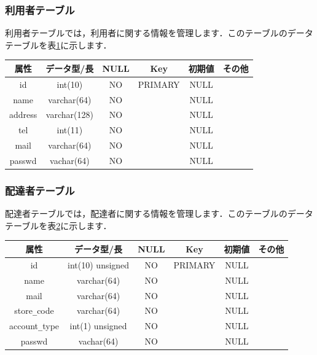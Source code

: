 \documentclass[a4j,titlepage]{jarticle}
\begin{document}
\subsubsection{利用者テーブル}
利用者テーブルでは，利用者に関する情報を管理します．このテーブルのデータテーブルを表\ref{userTable}に示します．
\begin{table}[htb]
  \label{userTable}
  \begin{center}
    \begin{tabular}{|c|c|c|c|c|c|} \hline
      属性 & データ型/長 & NULL & Key & 初期値 & その他 \\ \hline \hline
      id & int(10) & NO & PRIMARY & NULL & \\ \hline
      name & varchar(64) & NO &   & NULL & \\ \hline
      address & varchar(128) & NO &   & NULL & \\ \hline
      tel & int(11) & NO &   & NULL & \\ \hline
      mail & varchar(64) & NO &   & NULL & \\ \hline
      passwd & vachar(64) & NO &   & NULL & \\ \hline
    \end{tabular}
  \end{center}
\end{table}

\subsubsection{配達者テーブル}
配達者テーブルでは，配達者に関する情報を管理します．このテーブルのデータテーブルを表\ref{driverTable}に示します．
\begin{table}[htb]
  \label{driverTable}
  \begin{center}
    \begin{tabular}{|c|c|c|c|c|c|} \hline
      属性 & データ型/長 & NULL & Key & 初期値 & その他 \\ \hline \hline
      id & int(10) unsigned & NO & PRIMARY & NULL & \\ \hline
      name & varchar(64) & NO &   & NULL & \\ \hline
      mail & varchar(64) & NO &   & NULL & \\ \hline
      store\verb|_|code & varchar(64) & NO &   & NULL & \\ \hline
      account\verb|_|type & int(1) unsigned & NO &   & NULL & \\ \hline
      passwd & vachar(64) & NO &   & NULL & \\ \hline
    \end{tabular}
  \end{center}
\end{table}
\end{document}
